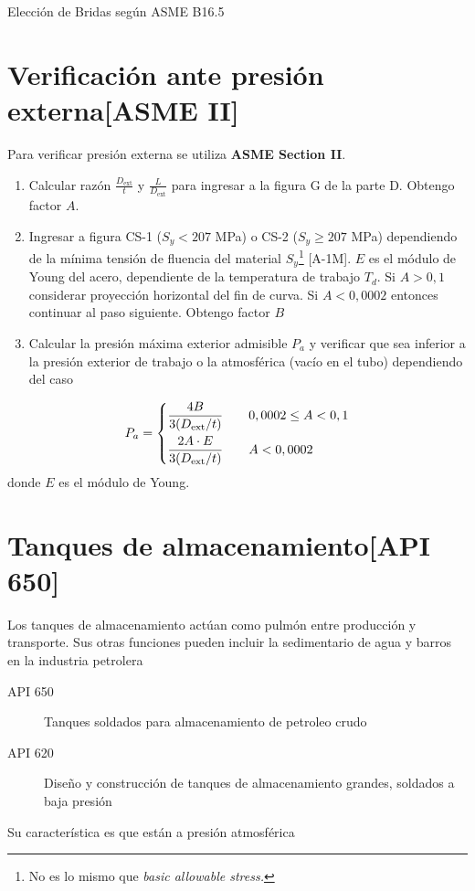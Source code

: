\documentclass[twocolumn]{article}
\newcommand{\Dext}{D_\text{ext}}
\begin{document}
Elección de Bridas según ASME B16.5
\section{Verificación ante presión externa[ASME II]} \label{sec:asmeii}
Para verificar presión externa se utiliza \textbf{ASME Section II}.
\begin{enumerate}
	\item Calcular razón $\frac{\Dext}{t}$ y $\frac{L}{\Dext}$ para ingresar a la figura G de la parte D. Obtengo factor $A$.
	\item Ingresar a figura CS-1 ($S_y<207$ MPa) o CS-2 ($S_y\geq207$ MPa) dependiendo de la mínima tensión de fluencia del material $S_y$\footnote{No es lo mismo que \textit{basic allowable stress.}} [A-1M]. $E$ es el módulo de Young del acero, dependiente de la temperatura de trabajo $T_d$. Si $A>0,1$ considerar proyección horizontal del fin de curva. Si $A<0,0002$ entonces continuar al paso siguiente. Obtengo factor $B$
	\item Calcular la presión máxima exterior admisible $P_a$ y verificar que sea inferior a la presión exterior de trabajo o la atmosférica (vacío en el tubo) dependiendo del caso
\end{enumerate}
\[
P_a = \begin{dcases}
\frac{4B}{3(\Dext/t)}\qquad 0,0002\leq A<0,1 \\
\frac{2A\cdot E}{3(\Dext/t)}\qquad  A<0,0002
\end{dcases}
\]
donde $E$ es el módulo de Young.

\section{Tanques de almacenamiento[API 650]}

Los tanques de almacenamiento actúan como pulmón entre producción y transporte. Sus otras funciones pueden incluir la sedimentario de agua y barros en la industria petrolera
\begin{description}
	\item[API 650] Tanques soldados para almacenamiento de petroleo crudo
	\item[API 620] Diseño y construcción de tanques de almacenamiento grandes, soldados a baja presión
\end{description}

Su característica es que están a presión atmosférica
\end{document}
